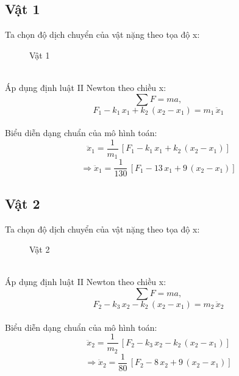 \documentclass{standalone}
\begin{document}
	\subsection{Vật 1}%
	Ta chọn độ dịch chuyển của vật nặng theo tọa độ x:
	\vspace{1cm}
	\begin{figure}[!htp]
		\centering
		
		\caption{Vật 1}
		\label{b1-vat-1}
	\end{figure}\\
	Áp dụng định luật II Newton theo chiều x:
		\[ \sum F = ma,\]
		\[F_1 - k_1\,x_1 + k_2\,(x_2 - x_1) = m_1\,\ddot x_1\]\\
	Biểu diễn dạng chuẩn của mô hình toán:
	\[\ddot x_1 = \frac{1}{m_1}\,\left[F_1 - k_1\,x_1 + k_2\,(x_2 - x_1)\right]\]
	\[ \Rightarrow \ddot x_1 = \frac{1}{130}\,\left[F_1 - 13\,x_1 + 9\,(x_2 - x_1)\right] \]
	\subsection{Vật 2}%
	Ta chọn độ dịch chuyển của vật nặng theo tọa độ x:
	\vspace{1cm}
	\begin{figure}[!htp]
		\centering
		
		\caption{Vật 2}
		\label{b1-vat-2}
	\end{figure}\\
	Áp dụng định luật II Newton theo chiều x:
		\[ \sum F = ma,\]
		\[F_2 - k_3\,x_2 - k_2\,(x_2 - x_1) = m_2\,\ddot x_2\]\\
	Biểu diễn dạng chuẩn của mô hình toán:
	\[\ddot x_2 = \frac{1}{m_2}\,\left[F_2 - k_3\,x_2 - k_2\,(x_2 - x_1)\right] \]
	\[ \Rightarrow \ddot x_2 = \frac{1}{80}\,\left[F_2 - 8\,x_2 + 9\,(x_2 - x_1)\right] \]
	
	
\end{document}
